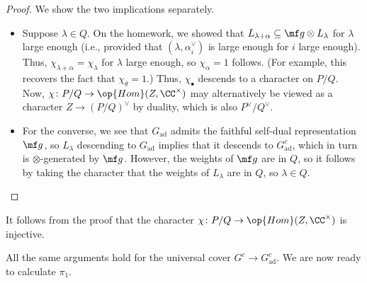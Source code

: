 \documentclass[../notes.tex]{subfiles}
\begin{document}
\begin{proof}
	We show the two implications separately.
	\begin{itemize}
		\item Suppose $\lambda\in Q$. On the homework, we showed that $L_{\lambda+\alpha}\subseteq\mf g\otimes L_\lambda$ for $\lambda$ large enough (i.e., provided that $(\lambda,\alpha_i^\lor)$ is large enough for $i$ large enough). Thus, $\chi_{\lambda+\alpha}=\chi_\lambda$ for $\lambda$ large enough, so $\chi_\alpha=1$ follows. (For example, this recovers the fact that $\chi_\theta=1$.) Thus, $\chi_\bullet$ descends to a character on $P/Q$. Now, $\chi\colon P/Q\to\op{Hom}(Z,\CC^\times)$ may alternatively be viewed as a character $Z\to(P/Q)^\lor$ by duality, which is also $P^\lor/Q^\lor$.
		\item For the converse, we see that $G_{\mathrm{ad}}$ admits the faithful self-dual representation $\mf g$, so $L_\lambda$ descending to $G_{\mathrm{ad}}$ implies that it descends to $G_{\mathrm{ad}}^c$, which in turn is $\otimes$-generated by $\mf g$. However, the weights of $\mf g$ are in $Q$, so it follows by taking the character that the weights of $L_\lambda$ are in $Q$, so $\lambda\in Q$.
		\qedhere
	\end{itemize}
\end{proof}
\begin{remark}
	It follows from the proof that the character $\chi\colon P/Q\to\op{Hom}(Z,\CC^\times)$ is injective.
\end{remark}
All the same arguments hold for the universal cover $G^c\to G_{\mathrm{ad}}^c$. We are now ready to calculate $\pi_1$.
\end{document}
